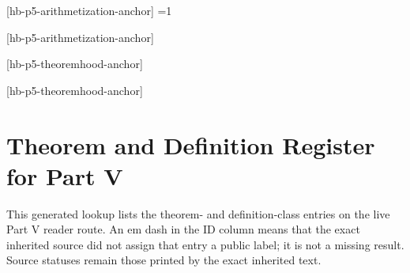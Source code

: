 






\setcounter{hbsourcep5theorem}{0}
[hb-p5-arithmetization-anchor]{%
  \ifnum\value{hbsourcep5theorem}=1
    \label{thm:arithmetization-syntax}%
  \fi}

[hb-p5-arithmetization-anchor]









[hb-p5-theoremhood-anchor]{%
  \label{thm:theoremhood-undecidable}}

[hb-p5-theoremhood-anchor]











\section*{Theorem and Definition Register for Part V}
\label{sec:p05-theorem-definition-register}

This generated lookup lists the theorem- and definition-class entries on the
live Part V reader route.  An em dash in the ID column means that the exact
inherited source did not assign that entry a public label; it is not a missing
result.  Source statuses remain those printed by the exact inherited text.


